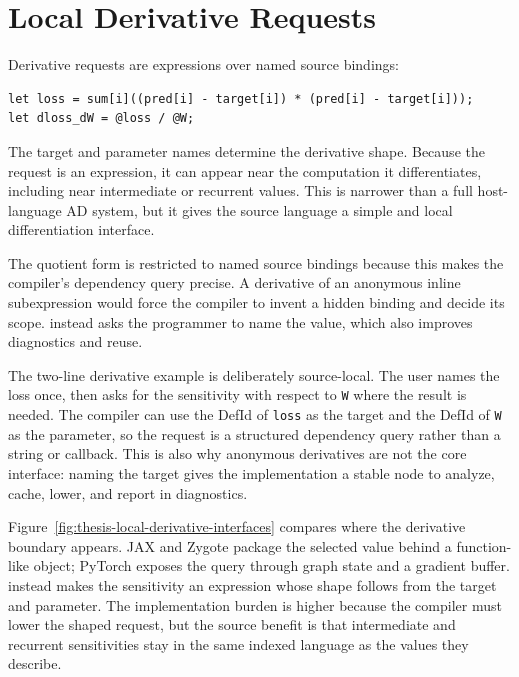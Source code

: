 \section{Local Derivative Requests}

Derivative requests are expressions over named source bindings:

\begin{lstlisting}[style=einlang]
let loss = sum[i]((pred[i] - target[i]) * (pred[i] - target[i]));
let dloss_dW = @loss / @W;
\end{lstlisting}

The target and parameter names determine the derivative shape. Because the
request is an expression, it can appear near the computation it differentiates,
including near intermediate or recurrent values. This is narrower than a full
host-language AD system, but it gives the source language a simple and local
differentiation interface.

The quotient form is restricted to named source bindings because this makes the
compiler's dependency query precise. A derivative of an anonymous inline
subexpression would force the compiler to invent a hidden binding and decide its
scope. \einlang{} instead asks the programmer to name the value, which also
improves diagnostics and reuse.

The two-line derivative example is deliberately source-local. The user names
the loss once, then asks for the sensitivity with respect to \texttt{W} where
the result is needed. The compiler can use the DefId of \texttt{loss} as the
target and the DefId of \texttt{W} as the parameter, so the request is a
structured dependency query rather than a string or callback. This is also why
anonymous derivatives are not the core interface: naming the target gives the
implementation a stable node to analyze, cache, lower, and report in
diagnostics.

\begin{center}
\centering

\captionsetup{type=figure,hypcap=false}
\caption{Thesis-adapted comparison of local derivative interfaces. The thesis
copy keeps the paper's motivating query but retunes the labels around the
implementation boundary that the autodiff passes consume.}
\label{fig:thesis-local-derivative-interfaces}
\end{center}

Figure~\ref{fig:thesis-local-derivative-interfaces} compares where the
derivative boundary appears. JAX and Zygote package the selected value behind a
function-like object; PyTorch exposes the query through graph state and a
gradient buffer. \einlang{} instead makes the sensitivity an expression whose
shape follows from the target and parameter. The implementation burden is
higher because the compiler must lower the shaped request, but the source
benefit is that intermediate and recurrent sensitivities stay in the same
indexed language as the values they describe.

